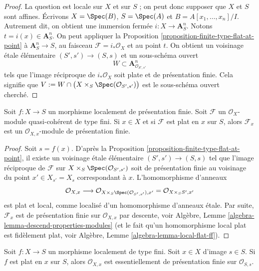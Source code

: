 \begin{proof}
La question est locale sur $X$ et sur $S$ ; on peut donc supposer que $X$ et $S$
sont affines. Écrivons $X = \Spec(B)$, $S = \Spec(A)$ et
$B = A[x_1, \ldots, x_n]/I$. Autrement dit, on obtient une immersion fermée
$i : X \to \mathbf{A}^n_S$. Notons $t = i(x) \in \mathbf{A}^n_S$.
On peut appliquer la
Proposition \ref{proposition-finite-type-flat-at-point}
à $\mathbf{A}^n_S \to S$, au faisceau $\mathcal{F} = i_*\mathcal{O}_X$
et au point $t$. On obtient un voisinage
\'etale élémentaire $(S', s') \to (S, s)$ et un sous-schéma ouvert
$$
W \subset \mathbf{A}^n_{\mathcal{O}_{S', s'}}
$$
tels que l'image réciproque de $i_*\mathcal{O}_X$ soit plate et de présentation
finie. Cela signifie que
$V := W \cap \big(X \times_S \Spec(\mathcal{O}_{S', s'})\big)$
est le sous-schéma ouvert cherché.
\end{proof}

\begin{lemma}
\label{lemma-finite-type-flat-at-point-local}
Soit $f : X \to S$ un morphisme localement de présentation finie.
Soit $\mathcal{F}$ un $\mathcal{O}_X$-module quasi-cohérent de type fini.
Si $x \in X$ et si $\mathcal{F}$ est plat en $x$ sur $S$, alors
$\mathcal{F}_x$ est un $\mathcal{O}_{X, x}$-module de présentation finie.
\end{lemma}

\begin{proof}
Soit $s = f(x)$. D'après la
Proposition \ref{proposition-finite-type-flat-at-point},
il existe un voisinage \'etale élémentaire $(S', s') \to (S, s)$
tel que l'image réciproque de $\mathcal{F}$ sur
$X \times_S \Spec(\mathcal{O}_{S', s'})$ soit de
présentation finie au voisinage du point $x' \in X_{s'} = X_s$
correspondant à $x$. L'homomorphisme d'anneaux
$$
\mathcal{O}_{X, x} \longrightarrow
\mathcal{O}_{X \times_S \Spec(\mathcal{O}_{S', s'}), x'}
=
\mathcal{O}_{X \times_S S', x'}
$$
est plat et local, comme localisé d'un homomorphisme d'anneaux \'etale. Par suite,
$\mathcal{F}_x$ est de présentation finie sur $\mathcal{O}_{X, x}$
par descente, voir
Algèbre, Lemme \ref{algebra-lemma-descend-properties-modules}
(et le fait qu'un homomorphisme local plat est fidèlement plat, voir
Algèbre, Lemme \ref{algebra-lemma-local-flat-ff}).
\end{proof}

\begin{lemma}
\label{lemma-finite-type-flat-at-point-local-X}
Soit $f : X \to S$ un morphisme localement de type fini.
Soit $x \in X$ d'image $s \in S$. Si $f$ est plat en $x$ sur $S$, alors
$\mathcal{O}_{X, x}$ est essentiellement de présentation finie sur
$\mathcal{O}_{S, s}$.
\end{lemma}

